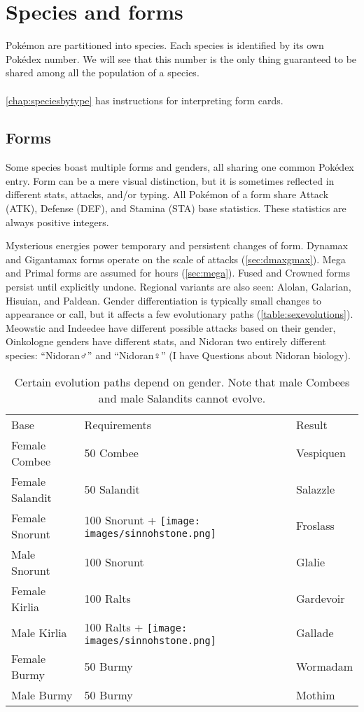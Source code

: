 \chapter{Species and forms\label{chap:species}}
Pokémon are partitioned into species.
Each species is identified by its own Pokédex number.
We will see that this number is the only thing guaranteed to be shared among all the population of a species.\\
\\
\autoref{chap:speciesbytype} has instructions for interpreting form cards.

\section{Forms\label{sec:forms}}
Some species boast multiple forms and genders, all sharing one common Pokédex entry.
Form can be a mere visual distinction, but it is sometimes reflected in different stats,
 attacks, and/or typing.
All Pokémon of a form share Attack (ATK), Defense (DEF), and Stamina (STA) base statistics.
These statistics are always positive integers.

Mysterious energies power temporary and persistent changes of form.
Dynamax and Gigantamax forms operate on the scale of attacks (\autoref{sec:dmaxgmax}).
Mega and Primal forms are assumed for hours (\autoref{sec:mega}).
Fused and Crowned forms persist until explicitly undone.
Regional variants are also seen: Alolan, Galarian, Hisuian, and Paldean.
Gender differentiation is typically small changes to appearance or call,
 but it affects a few evolutionary paths (\autoref{table:sexevolutions}).
Meowstic and Indeedee have different possible attacks based on their gender,
 Oinkologne genders have different stats, and Nidoran two entirely different
 species: ``Nidoran♂'' and ``Nidoran♀'' (I have Questions about Nidoran biology).
\begin{table}
\footnotesize
\centering
\begin{tabular}{lll}
Base & Requirements & Result \\
\Midrule
Female Combee	& 50 Combee & Vespiquen\\
Female Salandit & 50 Salandit & Salazzle\\
Female Snorunt & 100 Snorunt + \texttt{[image: images/sinnohstone.png]} & Froslass\\
Male Snorunt & 100 Snorunt & Glalie\\
Female Kirlia & 100 Ralts & Gardevoir\\
Male Kirlia & 100 Ralts + \texttt{[image: images/sinnohstone.png]} & Gallade\\
Female Burmy & 50 Burmy & Wormadam\\
Male Burmy & 50 Burmy & Mothim\\
\end{tabular}
\caption[Gender-dependent evolutions]{Certain evolution paths depend on gender. Note that male Combees and male Salandits cannot evolve.\label{table:sexevolutions}}
\end{table}

